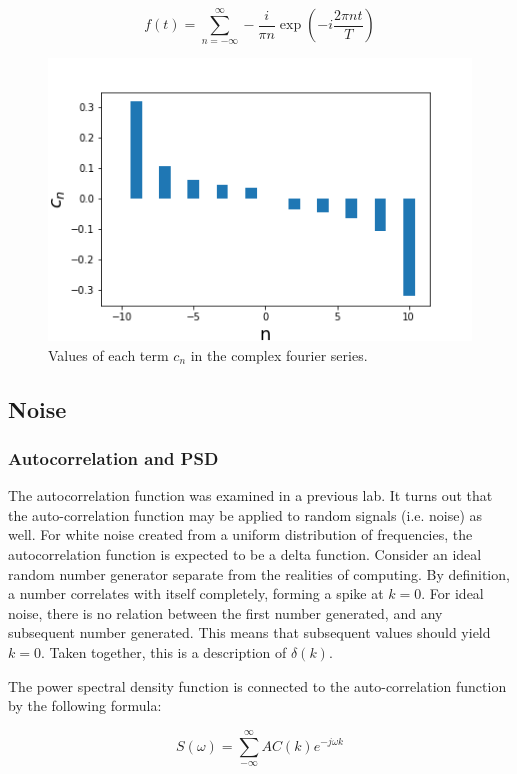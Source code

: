\documentclass[twocolumn]{article}
\begin{document}
\[
f(t) = \sum_{n= -\infty}^{\infty} -\frac{i}{\pi n} \exp(-i \frac{2\pi nt}{T})
\]

\begin{figure}
\centering
\includegraphics[width=\linewidth]{Figure2}
\caption{Values of each term $c_n$ in the complex fourier series.}
\label{fig:Figure2}
\end{figure}

\subsection{Noise}
\subsubsection{Autocorrelation and PSD}
The autocorrelation function was examined in a previous lab. It turns out that the auto-correlation function may be applied to random signals (i.e. noise) as well. For white noise created from a uniform distribution of frequencies, the autocorrelation function is expected to be a delta function. Consider an ideal random number generator separate from the realities of computing. By definition, a number correlates with itself completely, forming a spike at $k=0$. For ideal noise, there is no relation between the first number generated, and any subsequent number generated. This means that subsequent values should yield $k=0$. Taken together, this is a description of $\delta(k)$.

The power spectral density function is connected to the auto-correlation function by the following formula:

\[ S(\omega) = \sum_{-\infty}^{\infty} AC(k)e^{-j\omega k} \]
\end{document}
